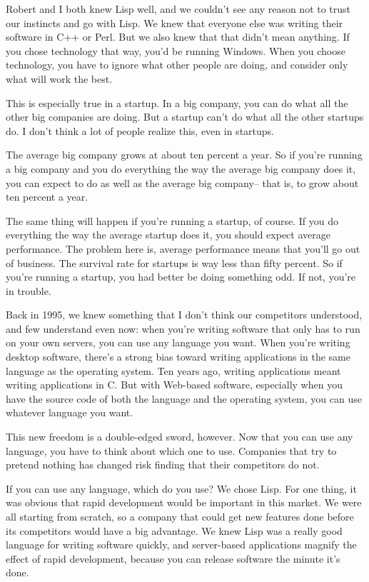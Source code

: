 \documentclass[10pt,twoside,openright]{memoir}
\begin{document}
Robert and I both knew Lisp well, and we couldn't see any reason not to trust our instincts and go with Lisp. We knew that everyone else was writing their software in C++ or Perl. But we also knew that that didn't mean anything. If you chose technology that way, you'd be running Windows. When you choose technology, you have to ignore what other people are doing, and consider only what will work the best.

This is especially true in a startup. In a big company, you can do what all the other big companies are doing. But a startup can't do what all the other startups do. I don't think a lot of people realize this, even in startups.

The average big company grows at about ten percent a year. So if you're running a big company and you do everything the way the average big company does it, you can expect to do as well as the average big company-- that is, to grow about ten percent a year.

The same thing will happen if you're running a startup, of course. If you do everything the way the average startup does it, you should expect average performance. The problem here is, average performance means that you'll go out of business. The survival rate for startups is way less than fifty percent. So if you're running a startup, you had better be doing something odd. If not, you're in trouble.

Back in 1995, we knew something that I don't think our competitors understood, and few understand even now: when you're writing software that only has to run on your own servers, you can use any language you want. When you're writing desktop software, there's a strong bias toward writing applications in the same language as the operating system. Ten years ago, writing applications meant writing applications in C. But with Web-based software, especially when you have the source code of both the language and the operating system, you can use whatever language you want.

This new freedom is a double-edged sword, however. Now that you can use any language, you have to think about which one to use. Companies that try to pretend nothing has changed risk finding that their competitors do not.

If you can use any language, which do you use? We chose Lisp. For one thing, it was obvious that rapid development would be important in this market. We were all starting from scratch, so a company that could get new features done before its competitors would have a big advantage. We knew Lisp was a really good language for writing software quickly, and server-based applications magnify the effect of rapid development, because you can release software the minute it's done.
\end{document}
